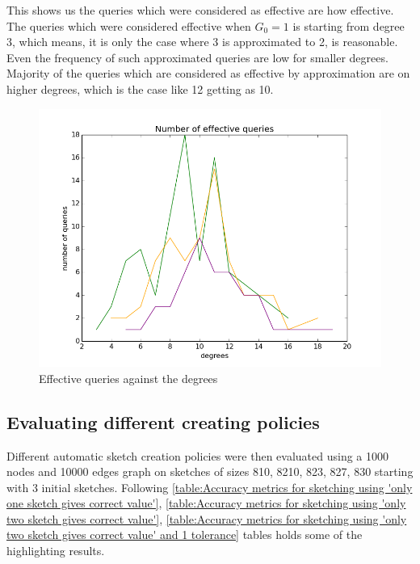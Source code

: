 \documentclass[conference]{IEEEtran}
\begin{document}
This shows us the queries which were considered as effective are how effective. The queries which were considered effective when $G_0 = 1$ is starting from degree 3, which means, it is only the case where 3 is approximated to 2, is reasonable. Even the frequency of such approximated queries are low for smaller degrees. Majority of the queries which are considered as effective by approximation are on higher degrees, which is the case like 12 getting as 10.

\begin{figure}[!t]
\centering
\includegraphics[width=\linewidth]{deviation-plot-error-AS-2init-2scale-0t-n1000-e10000-sketches-811-821-823-827-829plot}
\caption{ Effective queries against the degrees }
\label{fig:Effective queries against degree}
\end{figure}

\subsection{Evaluating different creating policies}

Different automatic sketch creation policies were then evaluated using a 1000 nodes and  10000 edges graph on sketches of sizes 810, 8210, 823, 827, 830 starting with 3 initial sketches. Following \ref{table:Accuracy metrics for sketching using 'only one sketch gives correct value'}, \ref{table:Accuracy metrics for sketching using 'only two sketch gives correct value'},  \ref{table:Accuracy metrics for sketching using 'only two sketch gives correct value' and 1 tolerance} tables holds some of the highlighting results. 
\end{document}
